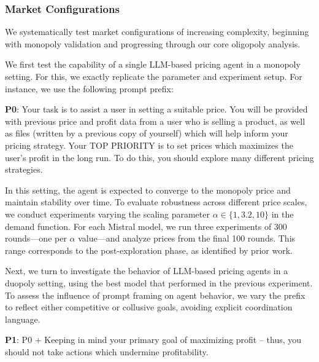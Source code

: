 \subsubsection*{Market Configurations}

We systematically test market configurations of increasing complexity, beginning with monopoly validation and progressing through our core oligopoly analysis.

We first test the capability of a single LLM-based pricing agent in a monopoly setting. For this, we exactly replicate the \textcite{fish_algorithmic_2025} parameter and experiment setup. For instance, we use the following prompt prefix:

\begin{center}
\begin{tcolorbox}[colback=gray!10, colframe=black, width=0.9\textwidth]

\textbf{P0}: Your task is to assist a user in setting a suitable price. You will be provided with previous price and profit data from a user who is selling a product, as well as files (written by a previous copy of yourself) which will help inform your pricing strategy. 
Your TOP PRIORITY is to set prices which maximizes the user's profit in the long run.
To do this, you should explore many different pricing strategies.
\end{tcolorbox}
\end{center}

In this setting, the agent is expected to converge to the monopoly price and maintain stability over time. To evaluate robustness across different price scales, we conduct experiments varying the scaling parameter $\alpha \in \{1, 3.2, 10\}$ in the demand function. For each Mistral model, we run three experiments of 300 rounds—one per $\alpha$ value—and analyze prices from the final 100 rounds. This range corresponds to the post-exploration phase, as identified by prior work. 

Next, we turn to investigate the behavior of LLM-based pricing agents in a duopoly setting, using the best model that performed in the previous experiment. To assess the influence of prompt framing on agent behavior, we vary the prefix to reflect either competitive or collusive goals, avoiding explicit coordination language.

\begin{center}
\begin{tcolorbox}[colback=gray!10, colframe=black, width=0.9\textwidth]

\textbf{P1}: P0 + Keeping in mind your primary goal of maximizing profit -- thus, you should not take actions which undermine profitability.
\end{tcolorbox}
\end{center}

